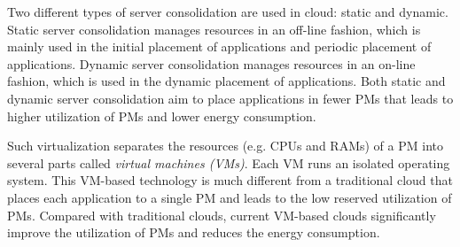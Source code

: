  Two different types of
server consolidation are used in cloud: static and dynamic. Static server consolidation manages resources in an off-line fashion, which is mainly 
used in the initial placement of applications and periodic placement of applications. Dynamic server consolidation manages resources in 
an on-line fashion, which is used in the dynamic placement of applications. Both static and dynamic server consolidation aim to place
applications in fewer PMs that leads to higher utilization of PMs and lower energy consumption.



Such virtualization separates the resources (e.g. CPUs and RAMs) of a PM into several parts called \emph{virtual machines (VMs)}. 
Each VM runs an isolated operating system. This VM-based technology is much different from a 
traditional cloud that places each application to a single PM and leads to the low reserved utilization of PMs. 
Compared with traditional clouds, current VM-based clouds significantly improve the utilization of PMs and reduces the energy consumption.




